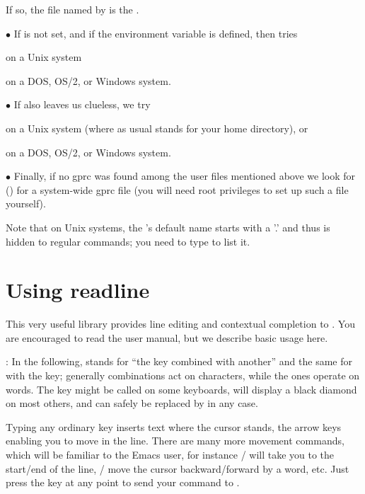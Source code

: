 \noindent If so, the file named by  is the .

\noindent$\bullet$ If  is not set, and if the environment variable
 is defined,  then tries

 on a Unix system

 on a DOS, OS/2, or Windows system.

\noindent$\bullet$ If  also leaves us clueless, we try

\strut{} on a Unix system (where as usual \kbd{\til} stands for
your home directory), or

 on a DOS, OS/2, or Windows system.

\noindent$\bullet$ Finally, if no gprc was found among the user files
mentioned above we look for  ()
for a system-wide gprc file (you will need root privileges to set up such a
file yourself).

Note that on Unix systems, the 's default name starts with a '.' and
thus is hidden to regular  commands; you need to type  to
list it.


\section{Using readline} 

This very useful library provides line editing and contextual completion
to . You are encouraged to read the  user manual,
but we describe basic usage here.

: \label{se:readline}
In the following,  stands for ``the  key combined with
another'' and the same for  with the  key; generally
 combinations act on characters, while the  ones operate on
words. The  key might be called  on some keyboards, will
display a black diamond on most others, and can safely be replaced by
 in any case.

Typing any ordinary key inserts text where the cursor stands, the arrow keys
enabling you to move in the line. There are many more movement commands,
which will be familiar to the Emacs user, for instance /
will take you to the start/end of the line, / move the
cursor backward/forward by a word, etc. Just press the  key at
any point to send your command to .

